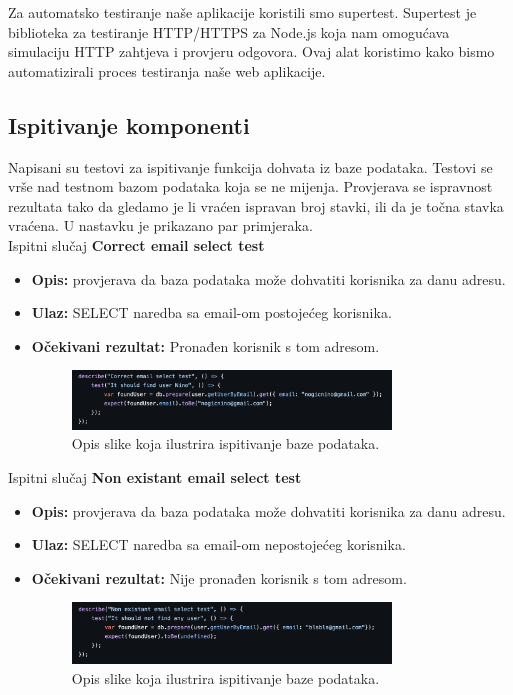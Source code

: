 			Za automatsko testiranje naše aplikacije koristili smo supertest.
			Supertest je biblioteka za testiranje HTTP/HTTPS za Node.js koja nam omogućava simulaciju HTTP zahtjeva i provjeru odgovora.
			Ovaj alat koristimo kako bismo automatizirali proces testiranja naše web aplikacije.
			
			\subsection{Ispitivanje komponenti}

			Napisani su testovi za ispitivanje funkcija dohvata iz baze podataka. Testovi se vrše nad testnom bazom podataka
			koja se ne mijenja. Provjerava se ispravnost rezultata tako da gledamo je li vraćen ispravan broj stavki,
			ili da je točna stavka vraćena.
			U nastavku je prikazano par primjeraka.
			\\

			Ispitni slučaj \textbf{Correct email select test}
			\begin{itemize}
				\item \textbf{Opis:} provjerava da baza podataka može dohvatiti korisnika za danu adresu.
				\item \textbf{Ulaz:} SELECT naredba sa email-om postojećeg korisnika.
				\item \textbf{Očekivani rezultat:} Pronađen korisnik s tom adresom.
				\begin{figure}[h]
					\centering
					\includegraphics[width=0.8\textwidth]{slike/testovi/db_correct_email_test.png}
					\caption{Opis slike koja ilustrira ispitivanje baze podataka.}
					\label{fig:testovi_db}
				\end{figure}
			\end{itemize}
			\newpage


			Ispitni slučaj \textbf{Non existant email select test}
			\begin{itemize}
				\item \textbf{Opis:} provjerava da baza podataka može dohvatiti korisnika za danu adresu.
				\item \textbf{Ulaz:} SELECT naredba sa email-om nepostojećeg korisnika.
				\item \textbf{Očekivani rezultat:} Nije pronađen korisnik s tom adresom.
				\begin{figure}[h]
					\centering
					\includegraphics[width=0.8\textwidth]{slike/testovi/db_no_email_test.png}
					\caption{Opis slike koja ilustrira ispitivanje baze podataka.}
					\label{fig:testovi_db}
				\end{figure}
			\end{itemize}
			
